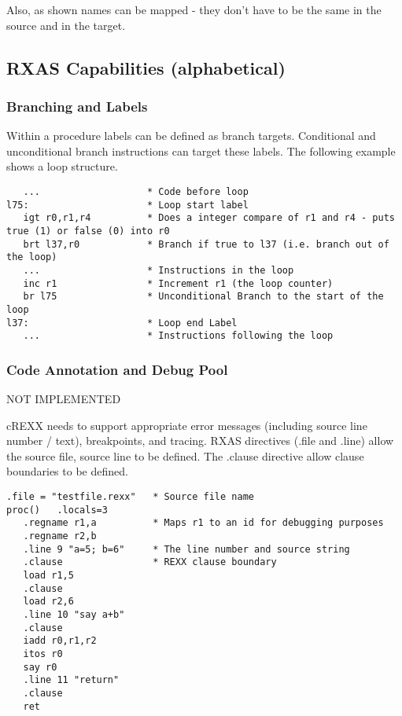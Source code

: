 Also, as shown names can be mapped - they don't have to be the same in
the source and in the target.

\hypertarget{rxas-capabilities-alphabetical}{%
\subsection{RXAS Capabilities
(alphabetical)}\label{rxas-capabilities-alphabetical}}

\hypertarget{branching-and-labels}{%
\subsubsection{Branching and Labels}\label{branching-and-labels}}

Within a procedure labels can be defined as branch targets. Conditional
and unconditional branch instructions can target these labels. The
following example shows a loop structure.

\begin{verbatim}
   ...                   * Code before loop
l75:                     * Loop start label
   igt r0,r1,r4          * Does a integer compare of r1 and r4 - puts true (1) or false (0) into r0
   brt l37,r0            * Branch if true to l37 (i.e. branch out of the loop)
   ...                   * Instructions in the loop
   inc r1                * Increment r1 (the loop counter)
   br l75                * Unconditional Branch to the start of the loop
l37:                     * Loop end Label 
   ...                   * Instructions following the loop
\end{verbatim}

\hypertarget{code-annotation-and-debug-pool}{%
\subsubsection{Code Annotation and Debug
Pool}\label{code-annotation-and-debug-pool}}

NOT IMPLEMENTED

cREXX needs to support appropriate error messages (including source line
number / text), breakpoints, and tracing. RXAS directives (.file and
.line) allow the source file, source line to be defined. The .clause
directive allow clause boundaries to be defined.

\begin{verbatim}
.file = "testfile.rexx"   * Source file name 
proc()   .locals=3
   .regname r1,a          * Maps r1 to an id for debugging purposes 
   .regname r2,b
   .line 9 "a=5; b=6"     * The line number and source string
   .clause                * REXX clause boundary
   load r1,5
   .clause
   load r2,6
   .line 10 "say a+b"
   .clause
   iadd r0,r1,r2
   itos r0
   say r0
   .line 11 "return"
   .clause
   ret
\end{verbatim}

